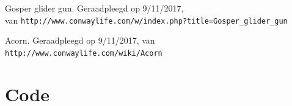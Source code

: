 \documentclass[10pt]{article}
\begin{document}
\begin{thebibliography}{9}
     Gosper glider gun. Geraadpleegd op 9/11/2017, \\
van \verb+http://www.conwaylife.com/w/index.php?title=Gosper_glider_gun+

	 Acorn. Geraadpleegd op 9/11/2017, 
van \verb+http://www.conwaylife.com/wiki/Acorn+
\end{thebibliography}

\section{Code}


\end{document}
